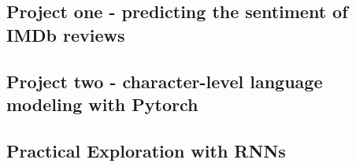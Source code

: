 \subsection{Project one - predicting the sentiment of IMDb reviews}

\subsection{Project two - character-level language modeling with Pytorch}

\subsection{Practical Exploration with RNNs}